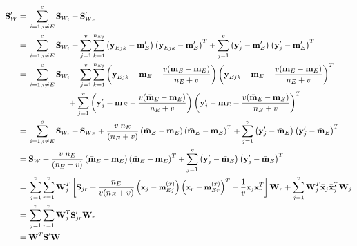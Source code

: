 \small
\begin{equation*}
\begin{split}
\textbf{S}_W' = \; & \sum_{i=1,i \neq E}^{c} \textbf{S}_{W_i} + \textbf{S}_{W_E}'
\\
= \; & \sum_{i=1,i \neq E}^{c} \textbf{S}_{W_i} + \sum_{j=1}^{v} \sum_{k=1}^{n_{Ej}} \left ( \textbf{y}_{Ejk} - \textbf{m}_E' \right ) \left ( \textbf{y}_{Ejk} - \textbf{m}_E' \right )^T + \sum_{j=1}^{v} \left ( \textbf{y}_{j}' - \textbf{m}_E' \right ) \left ( \textbf{y}_{j}' - \textbf{m}_E' \right )^T \\
= \; & \sum_{i=1,i \neq E}^{c} \textbf{S}_{W_i} + \sum_{j=1}^{v} \sum_{k=1}^{n_{Ej}} \left ( \textbf{y}_{Ejk} - \textbf{m}_E - \frac{v(\bar{\textbf{m}}_E - \textbf{m}_E)}{n_E + v} \right ) \left ( \textbf{y}_{Ejk} - \textbf{m}_E - \frac{v(\bar{\textbf{m}}_E - \textbf{m}_E)}{n_E + v} \right )^T
\\
\; & \hspace{1.7cm} + \sum_{j=1}^{v} \left ( \textbf{y}_{j}' - \textbf{m}_E - \frac{v(\bar{\textbf{m}}_E - \textbf{m}_E)}{n_E + v} \right ) \left ( \textbf{y}_{j}' - \textbf{m}_E - \frac{v(\bar{\textbf{m}}_E - \textbf{m}_E)}{n_E + v} \right )^T
\\
= \; & \sum_{i=1,i \neq E}^{c} \textbf{S}_{W_i} + \textbf{S}_{W_E} + \frac{v \; n_E}{(n_E+v)} \left ( \bar{\textbf{m}}_E - \textbf{m}_E \right ) \left ( \bar{\textbf{m}}_E - \textbf{m}_E \right )^T + \sum_{j=1}^{v} \left ( \textbf{y}_{j}' - \bar{\textbf{m}}_E \right ) \left ( \textbf{y}_{j}' - \bar{\textbf{m}}_E \right )^T
\\
= \; & \textbf{S}_W + \frac{v \; n_E}{(n_E+v)} \left ( \bar{\textbf{m}}_E - \textbf{m}_E \right ) \left ( \bar{\textbf{m}}_E - \textbf{m}_E \right )^T + \sum_{j=1}^{v} \left ( \textbf{y}_{j}' - \bar{\textbf{m}}_E \right ) \left ( \textbf{y}_{j}' - \bar{\textbf{m}}_E \right )^T
\\
= \; & \sum_{j=1}^{v} \sum_{r=1}^{v} \textbf{W}_j^T \left[ \textbf{S}_{jr} + \small{ {\displaystyle \frac{n_E}{v(n_E+v)}}} \left( \bar{\textbf{x}}_j -\textbf{m}_{Ej}^{(x)} \right) \left( \bar{\textbf{x}}_r -\textbf{m}_{Er}^{(x)} \right)^T - \frac{1}{v} \bar{\textbf{x}}_j \bar{\textbf{x}}_r^T \right] \textbf{W}_r + \sum_{j=1}^{v} \textbf{W}_j^T \bar{\textbf{x}}_j \bar{\textbf{x}}_j^T \textbf{W}_j
\\
= \; & \sum_{j=1}^{v} \sum_{r=1}^{v} \textbf{W}_j^T \textbf{S}_{jr}' \textbf{W}_r
\\
= \; & \textbf{W}^T \textbf{S}' \textbf{W} \\
\end{split}
\end{equation*}
\normalsize

